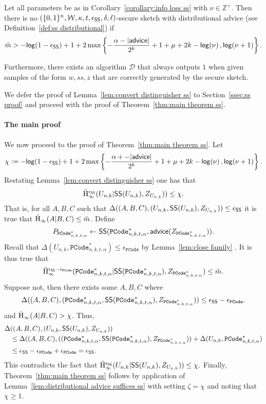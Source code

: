 \begin{lemma}
\label{lem:convert distinguisher ss}
Let all parameters be as in Corollary~\ref{corollary:info loss ss} with $\nu \in\mathbb{Z}^+$.  Then there is no $(\{0,1\}^n, \mathcal{W}, \kappa, t, \epsilon_{\mathsf{SS}}, \delta, \ell)$-secure sketch with distributional advice (see Definition~\ref{def:ss distributional}) if
\[
\tilde{m}> -\mathsf{log}\!\left(1-\epsilon_{\mathsf{SS}}\right) +1 + 2\max\left\{-\frac{\alpha-|{\mathsf{advice}}|}{2^k}+1+\mu+2k-\mathsf{log}\!\left(\nu\right), \mathsf{log}\!\left(\nu+1\right)\right\}.
\]

Furthermore, there exists an algorithm $\mathcal{D}$ that always outputs $1$ when given samples of the form $w, ss, z$ that are correctly generated by the secure sketch.
\end{lemma}

\noindent
We defer the proof of Lemma~\ref{lem:convert distinguisher ss} to Section~\ref{ssec:ss proof} and proceed with the proof of Theorem~\ref{thm:main theorem ss}.

\paragraph{The main proof}
We now proceed to the proof of Theorem~\ref{thm:main theorem ss}.   Let \[\chi:= -\mathsf{log}\!\left(1-\epsilon_{\mathsf{SS}}\right) +1 + 2\max\left\{-\frac{\alpha+-|{\mathsf{advice}}|}{2^k}+1+\mu+2k-\mathsf{log}\!\left(\nu\right), \mathsf{log}\!\left(\nu+1\right)\right\}.\]  Restating Lemma~\ref{lem:convert distinguisher ss} one has that 
\[
\tilde{\mathrm{H}}_\infty^{\epsilon_{\mathsf{SS}}}(U_{n,k} | {\mathsf{SS}}(U_{n,k}), Z_{U_{n,k}})) \le \chi.
\]
That is, for all $A, B, C$ such that $\Delta((A, B, C), (U_{n,k},{\mathsf{SS}}(U_{n,k}), Z_{U_{n,k}}))\le \epsilon_{{\mathsf{SS}}}$ it is true that $\tilde{\mathrm{H}}_\infty(A|B, C) \le \tilde{m}$.  Define \[P_{\mathtt{PCode}_{n, k, t, \alpha}^{*}}\leftarrow {\ensuremath{\mathsf{SS}}}(\mathtt{PCode}_{n, k, t, \alpha}^{*}, {\mathsf{advice}}(Z_{\mathtt{PCode}_{n, k, t, \alpha}^{*}})).\]
Recall that $\Delta(U_{n,k}, \mathtt{PCode}_{n, k, t, \alpha}^{*}) \le \epsilon_{\mathtt{PCode}}$ by Lemma~\ref{lem:close family} .  
It is thus true that 
\[
\tilde{\mathrm{H}}_\infty^{\epsilon_{{\mathsf{SS}}}-\epsilon_{\mathtt{PCode}}}(\mathtt{PCode}_{n, k, t, \alpha}^{*} | {\mathsf{SS}}(\mathtt{PCode}_{n, k, t, \alpha}^{*}), Z_{\mathtt{PCode}_{n, k, t, \alpha}^{*}})\le \tilde{m}.
\]
Suppose not, then there exists some $A, B, C$ where 
\[
\Delta((A, B, C), (\mathtt{PCode}_{n, k, t, \alpha}^{*} , {\mathsf{SS}}(\mathtt{PCode}_{n, k, t, \alpha}^{*}), Z_{\mathtt{PCode}_{n, k, t, \alpha}^{*}}))\le \epsilon_{{\mathsf{SS}}}-\epsilon_{\mathtt{PCode}}.
\]
and $\tilde{\mathrm{H}}_\infty(A|B, C)>\chi$.
Thus, 
\begin{align*}
\Delta&((A, B, C), (U_{n,k},{\mathsf{SS}}(U_{n,k}), Z_{U_{n,k}}))\\&\le \Delta((A, B, C), ((\mathtt{PCode}_{n, k, t, \alpha}^{*} , {\mathsf{SS}}(\mathtt{PCode}_{n, k, t, \alpha}^{*}), Z_{\mathtt{PCode}_{n, k, t, \alpha}^{*}}))+\Delta(U_{n,k}, \mathtt{PCode}_{n, k, t, \alpha}^{*})\\
&\le \epsilon_{{\mathsf{SS}}}-\epsilon_{\mathtt{PCode}}+ \epsilon_{\mathtt{PCode}} = \epsilon_{{\mathsf{SS}}}.
\end{align*}
This contradicts the fact that $\tilde{\mathrm{H}}_\infty^{\epsilon_{\mathsf{SS}}}(U_{n,k} | {\mathsf{SS}}(U_{n,k}), Z_{U_{n,k}})) \le \chi.$
Finally, Theorem~\ref{thm:main theorem ss} follows by application of Lemma~\ref{lem:distributional advice suffices ss} with setting $\zeta = \chi$ and noting that $\chi\ge 1$.



